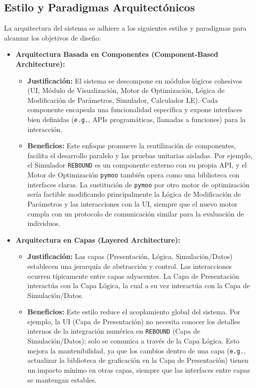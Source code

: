 \subsection{Estilo y Paradigmas Arquitectónicos}

La arquitectura del sistema se adhiere a los siguientes estilos y paradigmas para alcanzar los objetivos de diseño:

\begin{itemize}
    \item \textbf{Arquitectura Basada en Componentes (Component-Based Architecture):}
    \begin{itemize}
        \item \textbf{Justificación:} El sistema se descompone en módulos lógicos cohesivos (UI, Módulo de Visualización, Motor de Optimización, Lógica de Modificación de Parámetros, Simulador, Calculador LE). Cada componente encapsula una funcionalidad específica y expone interfaces bien definidas (\texttt{e.g.}, APIs programáticas, llamadas a funciones) para la interacción.
        \item \textbf{Beneficios:} Este enfoque promueve la reutilización de componentes, facilita el desarrollo paralelo y las pruebas unitarias aisladas. Por ejemplo, el Simulador \texttt{REBOUND} es un componente externo con su propia API, y el Motor de Optimización \texttt{pymoo} también opera como una biblioteca con interfaces claras. La sustitución de \texttt{pymoo} por otro motor de optimización sería factible modificando principalmente la Lógica de Modificación de Parámetros y las interacciones con la UI, siempre que el nuevo motor cumpla con un protocolo de comunicación similar para la evaluación de individuos.
    \end{itemize}

    \item \textbf{Arquitectura en Capas (Layered Architecture):}
    \begin{itemize}
        \item \textbf{Justificación:} Las capas (Presentación, Lógica, Simulación/Datos) establecen una jerarquía de abstracción y control. Las interacciones ocurren típicamente entre capas adyacentes. La Capa de Presentación interactúa con la Capa Lógica, la cual a su vez interactúa con la Capa de Simulación/Datos.
        \item \textbf{Beneficios:} Este estilo reduce el acoplamiento global del sistema. Por ejemplo, la UI (Capa de Presentación) no necesita conocer los detalles internos de la integración numérica en \texttt{REBOUND} (Capa de Simulación/Datos); solo se comunica a través de la Capa Lógica. Esto mejora la mantenibilidad, ya que los cambios dentro de una capa (\texttt{e.g.}, actualizar la biblioteca de graficación en la Capa de Presentación) tienen un impacto mínimo en otras capas, siempre que las interfaces entre capas se mantengan estables.
    \end{itemize}


\end{itemize}
